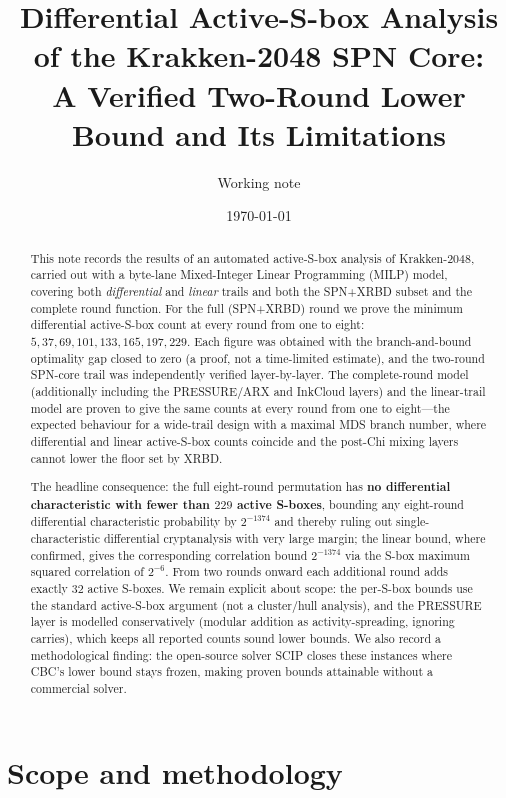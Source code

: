 \documentclass[11pt,a4paper]{article}
\title{\textbf{Differential Active-S-box Analysis of the Krakken-2048 SPN Core:\\
A Verified Two-Round Lower Bound and Its Limitations}}
\author{Working note}
\date{\today}
\begin{document}
\maketitle

\begin{abstract}
This note records the results of an automated active-S-box analysis of
Krakken-2048, carried out with a byte-lane Mixed-Integer Linear Programming
(MILP) model, covering both \emph{differential} and \emph{linear} trails and
both the SPN+XRBD subset and the complete round function. For the full
(SPN+XRBD) round we prove the minimum differential active-S-box count at every
round from one to eight: $5, 37, 69, 101, 133, 165, 197, 229$. Each figure was
obtained with the branch-and-bound optimality gap closed to zero (a proof, not a
time-limited estimate), and the two-round SPN-core trail was independently
verified layer-by-layer. The complete-round model (additionally including the
PRESSURE/ARX and InkCloud layers) and the linear-trail model are proven to give
the same counts at every round from one to eight---the expected behaviour for a
wide-trail design with a maximal MDS branch number, where differential and
linear active-S-box counts coincide and the post-Chi mixing layers cannot lower
the floor set by XRBD.

The headline consequence: the full eight-round permutation has \textbf{no
differential characteristic with fewer than $229$ active S-boxes}, bounding any
eight-round differential characteristic probability by $2^{-1374}$ and thereby
ruling out single-characteristic differential cryptanalysis with very large
margin; the linear bound, where confirmed, gives the corresponding correlation
bound $2^{-1374}$ via the S-box maximum squared correlation of $2^{-6}$. From two
rounds onward each additional round adds exactly $32$ active S-boxes. We remain
explicit about scope: the per-S-box bounds use the standard active-S-box
argument (not a cluster/hull analysis), and the PRESSURE layer is modelled
conservatively (modular addition as activity-spreading, ignoring carries), which
keeps all reported counts sound lower bounds. We also record a methodological
finding: the open-source solver SCIP closes these instances where CBC's lower
bound stays frozen, making proven bounds attainable without a commercial solver.
\end{abstract}

\section{Scope and methodology}
\end{document}
